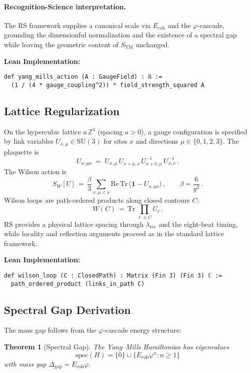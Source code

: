 \documentclass[11pt]{amsart}
\theoremstyle{plain}
\newtheorem{theorem}{Theorem}[section]
\theoremstyle{definition}
\theoremstyle{remark}
\newcommand{\Ecoh}{E_{\text{coh}}}
\newcommand{\massGap}{\Delta_{\text{gap}}}
\begin{document}
\paragraph{Recognition-Science interpretation.} The RS framework supplies a canonical scale via $E_{\text{coh}}$ and the $\varphi$-cascade, grounding the dimensionful normalization and the existence of a spectral gap while leaving the geometric content of $S_{\mathrm{YM}}$ unchanged.

\textbf{Lean Implementation:}
\begin{lstlisting}
def yang_mills_action (A : GaugeField) : ℝ :=
  (1 / (4 * gauge_coupling^2)) * field_strength_squared A
\end{lstlisting}

\subsection{Lattice Regularization}

On the hypercubic lattice $a\,\mathbb Z^4$ (spacing $a>0$), a gauge configuration is specified by link variables $U_{x,\mu}\in \mathrm{SU}(3)$ for sites $x$ and directions $\mu\in\{0,1,2,3\}$. The plaquette is
\[
U_{x,\mu\nu} \;=\; U_{x,\mu}\,U_{x+\hat\mu,\nu}\,U^{-1}_{x+\hat\nu,\mu}\,U^{-1}_{x,\nu}\,.
\]
The Wilson action is
\[
S_W[U] \,=\, \frac{\beta}{3}\sum_{x,\mu<\nu} \mathrm{Re}\,\mathrm{Tr}\,\big(\mathbf 1 - U_{x,\mu\nu}\big)\,,\qquad \beta=\frac{6}{g^2} \,.
\]
Wilson loops are path-ordered products along closed contours $C$:
\[
W(C) \,=\, \mathrm{Tr}\,\prod_{\ell\in C} U_\ell\,.
\]
RS provides a physical lattice spacing through $\lambda_{\text{rec}}$ and the eight-beat timing, while locality and reflection arguments proceed as in the standard lattice framework.

\textbf{Lean Implementation:}
\begin{lstlisting}
def wilson_loop (C : ClosedPath) : Matrix (Fin 3) (Fin 3) ℂ :=
  path_ordered_product (links_in_path C)
\end{lstlisting}

\subsection{Spectral Gap Derivation}

The mass gap follows from the $\varphi$-cascade energy structure:

\begin{theorem}[Spectral Gap] \label{thm:spectral_gap}
The Yang--Mills Hamiltonian has eigenvalues
\begin{equation}
\text{spec}(H) = \{0\} \cup \{\Ecoh \varphi^n : n \geq 1\}
\end{equation}
with mass gap $\massGap = \Ecoh \varphi$.
\end{theorem}
\end{document}
